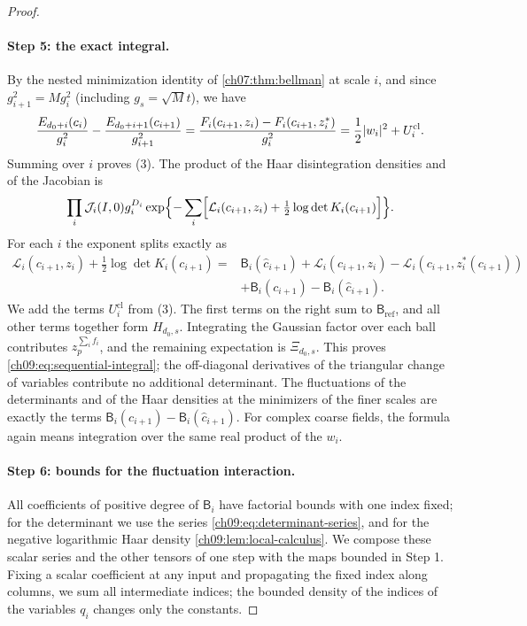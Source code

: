 \begin{proof}
\paragraph{Step 5: the exact integral.}
By the nested minimization identity of \cref{ch07:thm:bellman} at scale $i$, and since $g_{i+1}^2=Mg_i^2$ (including $g_s=\sqrt Mt$), we have
\[
 \frac{E_{d_0+i}(c_i)}{g_i^2}-\frac{E_{d_0+i+1}(c_{i+1})}{g_{i+1}^2}=\frac{F_i(c_{i+1},z_i)-F_i(c_{i+1},z_i^*)}{g_i^2}=\frac12\lvert w_i\rvert^2+U_i^{\mathrm{cl}}.
\]
Summing over $i$ proves (3). The product of the Haar disintegration densities and of the Jacobian is
\[
 \prod_i\mathcal J_i(I,0)g_i^{D_i}\exp\Bigl\{-\sum_i\Bigl[\mathcal L_i(c_{i+1},z_i)+\tfrac12\log\det K_i(c_{i+1})\Bigr]\Bigr\}.
\]
For each $i$ the exponent splits exactly as
\begin{align*}
 \mathcal L_i(c_{i+1},z_i)+\tfrac12\log\det K_i(c_{i+1})
 ={}&\mathsf B_i(\widehat c_{i+1})+\mathcal L_i(c_{i+1},z_i)-\mathcal L_i(c_{i+1},z_i^*(c_{i+1}))\\
 &+\mathsf B_i(c_{i+1})-\mathsf B_i(\widehat c_{i+1}).
\end{align*}
We add the terms $U_i^{\mathrm{cl}}$ from (3). The first terms on the right sum to $\mathsf B_{\mathrm{ref}}$, and all other terms together form $H_{d_0,s}$. Integrating the Gaussian factor over each ball contributes $z_p^{\sum_if_i}$, and the remaining expectation is $\Xi_{d_0,s}$. This proves \eqref{ch09:eq:sequential-integral}; the off-diagonal derivatives of the triangular change of variables contribute no additional determinant. The fluctuations of the determinants and of the Haar densities at the minimizers of the finer scales are exactly the terms $\mathsf B_i(c_{i+1})-\mathsf B_i(\widehat c_{i+1})$. For complex coarse fields, the formula again means integration over the same real product of the $w_i$.

\paragraph{Step 6: bounds for the fluctuation interaction.}
All coefficients of positive degree of $\mathsf B_i$ have factorial bounds with one index fixed; for the determinant we use the series \eqref{ch09:eq:determinant-series}, and for the negative logarithmic Haar density \cref{ch09:lem:local-calculus}. We compose these scalar series and the other tensors of one step with the maps bounded in Step 1. Fixing a scalar coefficient at any input and propagating the fixed index along columns, we sum all intermediate indices; the bounded density of the indices of the variables $q_i$ changes only the constants.


\end{proof}
